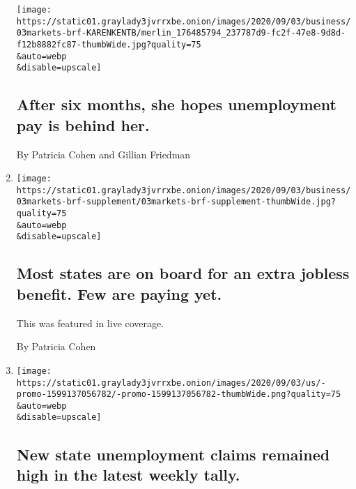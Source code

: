 \begin{enumerate}
  \texttt{[image: https://static01.graylady3jvrrxbe.onion/images/2020/09/03/business/03markets-brf-KARENKENTB/merlin\_176485794\_237787d9-fc2f-47e8-9d8d-f12b8882fc87-thumbWide.jpg?quality=75\\\&auto=webp\\\&disable=upscale]}

  \hypertarget{after-six-months-she-hopes-unemployment-pay-is-behind-her}{%
  \subsection{After six months, she hopes unemployment pay is behind
  her.}\label{after-six-months-she-hopes-unemployment-pay-is-behind-her}}

  By Patricia Cohen and Gillian Friedman
\item
  \href{/live/2020/09/03/business/stock-market-today-coronavirus/most-states-are-on-board-for-an-extra-jobless-benefit-few-are-paying-yet}{}

  \texttt{[image: https://static01.graylady3jvrrxbe.onion/images/2020/09/03/business/03markets-brf-supplement/03markets-brf-supplement-thumbWide.jpg?quality=75\\\&auto=webp\\\&disable=upscale]}

  \hypertarget{most-states-are-on-board-for-an-extra-jobless-benefit-few-are-paying-yet}{%
  \subsection{Most states are on board for an extra jobless benefit. Few
  are paying
  yet.}\label{most-states-are-on-board-for-an-extra-jobless-benefit-few-are-paying-yet}}

  This was featured in live coverage.

  By Patricia Cohen
\item
  \href{/live/2020/09/03/business/stock-market-today-coronavirus/new-state-unemployment-claims-remained-high-in-the-latest-weekly-tally}{}

  \texttt{[image: https://static01.graylady3jvrrxbe.onion/images/2020/09/03/us/-promo-1599137056782/-promo-1599137056782-thumbWide.png?quality=75\\\&auto=webp\\\&disable=upscale]}

  \hypertarget{new-state-unemployment-claims-remained-high-in-the-latest-weekly-tally}{%
  \subsection{New state unemployment claims remained high in the latest
  weekly
  tally.}\label{new-state-unemployment-claims-remained-high-in-the-latest-weekly-tally}}


\end{enumerate}
